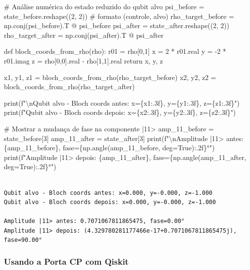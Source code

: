 \documentclass[
  brazilian,
]{report}
\newenvironment{Shaded}{\begin{snugshade}}{\end{snugshade}}
\newcommand{\NormalTok}[1]{\textcolor[rgb]{0.00,0.23,0.31}{#1}}
\begin{document}
\begin{Shaded}
\begin{Highlighting}[]


\NormalTok{\# Análise numérica do estado reduzido do qubit alvo}
\NormalTok{psi\_before = state\_before.reshape((2, 2))    \# formato (controle, alvo)}
\NormalTok{rho\_target\_before = np.conj(psi\_before).T @ psi\_before}
\NormalTok{psi\_after = state\_after.reshape((2, 2))}
\NormalTok{rho\_target\_after = np.conj(psi\_after).T @ psi\_after}

\NormalTok{def bloch\_coords\_from\_rho(rho):}
\NormalTok{    r01 = rho[0,1]}
\NormalTok{    x = 2 * r01.real}
\NormalTok{    y = {-}2 * r01.imag}
\NormalTok{    z = rho[0,0].real {-} rho[1,1].real}
\NormalTok{    return x, y, z}

\NormalTok{x1, y1, z1 = bloch\_coords\_from\_rho(rho\_target\_before)}
\NormalTok{x2, y2, z2 = bloch\_coords\_from\_rho(rho\_target\_after)}

\NormalTok{print(f"\textbackslash{}nQubit alvo {-} Bloch coords antes: x=\{x1:.3f\}, y=\{y1:.3f\}, z=\{z1:.3f\}")}
\NormalTok{print(f"Qubit alvo {-} Bloch coords depois: x=\{x2:.3f\}, y=\{y2:.3f\}, z=\{z2:.3f\}")}

\NormalTok{\# Mostrar a mudança de fase na componente |11\textgreater{}}
\NormalTok{amp\_11\_before = state\_before[3]}
\NormalTok{amp\_11\_after = state\_after[3]}
\NormalTok{print(f"\textbackslash{}nAmplitude |11\textgreater{} antes: \{amp\_11\_before\}, fase=\{np.angle(amp\_11\_before, deg=True):.2f\}°")}
\NormalTok{print(f"Amplitude |11\textgreater{} depois: \{amp\_11\_after\}, fase=\{np.angle(amp\_11\_after, deg=True):.2f\}°")}
\end{Highlighting}
\end{Shaded}

\begin{verbatim}

Qubit alvo - Bloch coords antes: x=0.000, y=-0.000, z=-1.000
Qubit alvo - Bloch coords depois: x=0.000, y=-0.000, z=-1.000

Amplitude |11> antes: 0.7071067811865475, fase=0.00°
Amplitude |11> depois: (4.329780281177466e-17+0.7071067811865475j), fase=90.00°
\end{verbatim}

\subsubsection{Usando a Porta CP com
Qiskit}\label{usando-a-porta-cp-com-qiskit}
\end{document}
